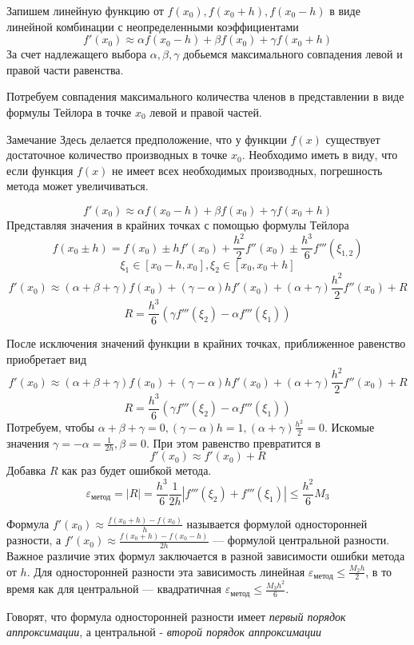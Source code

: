 \documentclass[professionalfonts,compress,unicode]{beamer}
\begin{document}
{
	Запишем линейную функцию от $f(x_0), f(x_0+h), f(x_0-h)$ в виде линейной комбинации с неопределенными коэффициентами
	$$
	f'(x_0) \approx \alpha f(x_0-h)  + \beta f(x_0) + \gamma f(x_0+h)
	$$
	За счет надлежащего выбора $\alpha, \beta, \gamma$ добьемся максимального совпадения левой и правой части равенства.
	
	\pause
	Потребуем совпадения максимального количества членов в представлении в виде формулы Тейлора в точке $x_0$ левой и правой частей.
	\begin{block}{Замечание}
	Здесь делается предположение, что у функции $f(x)$ существует достаточное количество производных в точке $x_0$. 
	Необходимо иметь в виду, что если функция $f(x)$ не имеет всех необходимых производных, погрешность метода может увеличиваться.
	\end{block}
}

{
	$$
	f'(x_0) \approx \alpha f(x_0-h)  + \beta f(x_0) + \gamma f(x_0+h)
	$$
	Представляя значения в крайних точках с помощью формулы Тейлора
	$$
	f(x_0 \pm h) = f(x_0) \pm h f'(x_0) + \frac{h^2}{2} f''(x_0) \pm \frac{h^3}{6} f'''(\xi_{1,2})
	$$
	$$
	\xi_1 \in [x_0-h, x_0],\xi_2 \in [x_0, x_0+h]
	$$
	$$
	f'(x_0) \approx (\alpha + \beta + \gamma) f(x_0) + (\gamma - \alpha) h f'(x_0) + (\alpha+\gamma) \frac{h^2}{2}f''(x_0) + R
	$$
	$$
	R = \frac{h^3}{6}(\gamma f'''(\xi_2) - \alpha f'''(\xi_1))
	$$
}

{
	После исключения значений функции в крайних точках, приближенное равенство приобретает вид
	$$
	f'(x_0) \approx (\alpha + \beta + \gamma) f(x_0) + (\gamma - \alpha) h f'(x_0) + (\alpha+\gamma) \frac{h^2}{2}f''(x_0) + R
	$$
	$$
	R = \frac{h^3}{6}(\gamma f'''(\xi_2) - \alpha f'''(\xi_1))
	$$
	Потребуем, чтобы $\alpha + \beta + \gamma = 0, (\gamma - \alpha) h = 1, (\alpha+\gamma) \frac{h^2}{2} = 0$. 
	Искомые значения $\gamma = -\alpha = \frac{1}{2h}, \beta = 0$.
	При этом равенство превратится в 
	$$
	f'(x_0) \approx f'(x_0) + R
	$$
	Добавка $R$ как раз будет ошибкой метода. 
	$$
	\varepsilon_{\text{метод}} = |R| = \frac{h^3}{6} \frac{1}{2h}|f'''(\xi_2) + f'''(\xi_1)| \leq \frac{h^2}{6} M_3
	$$
}

{
	Формула $f'(x_0) \approx \frac{f(x_0+h) - f(x_0)}{h}$ называется формулой односторонней разности, а
	$f'(x_0) \approx \frac{f(x_0 + h) - f(x_0 - h)}{2h}$ --- формулой центральной разности. Важное различие этих формул заключается
	в разной зависимости ошибки метода от $h$. Для односторонней разности эта зависимость линейная 
	$\varepsilon_{\text{метод}} \leq \frac{M_2 h}{2}$, в то время как для центральной --- квадратичная
	$\varepsilon_{\text{метод}} \leq \frac{M_3 h^2}{6}$.
	\pause
	
	Говорят, что формула односторонней разности имеет \emph{первый порядок аппроксимации},
	а центральной - \emph{второй порядок аппроксимации}
}
\end{document}
